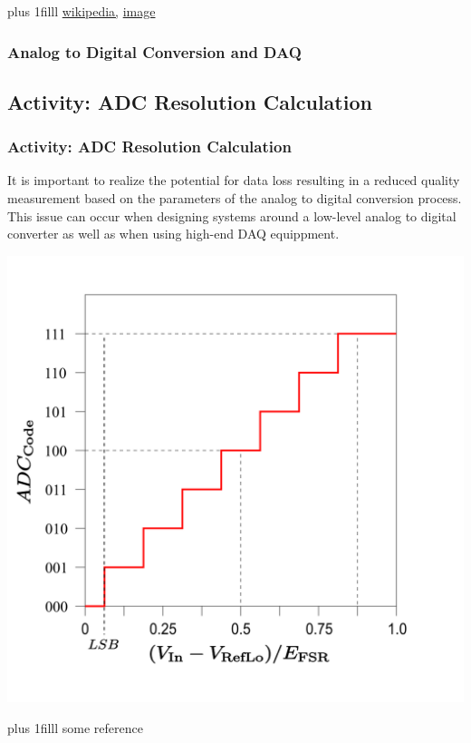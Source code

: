 \documentclass[fleqn]{beamer} %
\newcommand{\sectionIsubsectionIIItitle}{Analog to Digital Conversion and DAQ}
\newcommand{\sectionIsubsectionIVtitle}{Activity: ADC Resolution Calculation}
\newcommand{\btVFill}{\vskip0pt plus 1filll}
\begin{document}
\begin{frame}
				\btVFill
				\tiny{\href{https://en.wikipedia.org/wiki/Analog-to-digital_converter}{wikipedia,} \href{https://en.wikipedia.org/wiki/Analog-to-digital_converter\#/media/File:WM_WM8775SEDS-AB.jpg}{image} }	
			\end{frame}	

			\begin{frame} 
				\frametitle{\sectionIsubsectionIIItitle}

				
			\end{frame}	

		\subsection{\sectionIsubsectionIVtitle}\label{sectionIsubsectionIV}	

			\begin{frame}
				\frametitle{\sectionIsubsectionIVtitle} \scriptsize
				\bigskip

				It is important to realize the potential for data loss resulting in a reduced quality measurement based on the parameters of the analog to digital conversion process. This issue can occur when designing systems around a low-level analog to digital converter as well as when using high-end DAQ equippment.  

				\includegraphics[scale=.2]{images/ADC_voltage_resolution.png}

				\btVFill
				\tiny{some reference}	

			\end{frame}
\end{document}
